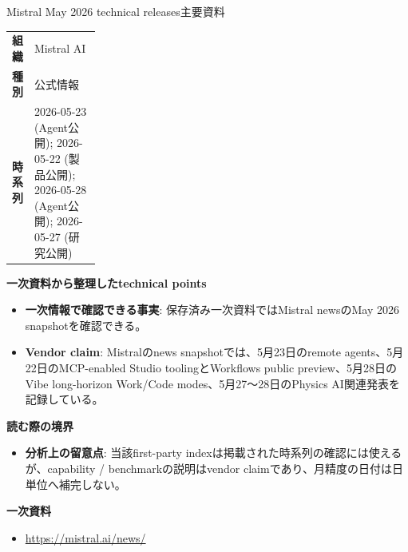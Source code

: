 \begin{technicalnote}{Mistral May 2026 technical releases}{主要資料}
\begingroup
\begin{tabularx}{\linewidth}{@{}>{\bfseries}p{0.22\linewidth}X@{}}
組織 & Mistral AI \\
種別 & 公式情報 \\
時系列 & 2026-05-23 (Agent公開); 2026-05-22 (製品公開); 2026-05-28 (Agent公開); 2026-05-27 (研究公開) \\
\end{tabularx}
\smallskip
{\bfseries 一次資料から整理したtechnical points}
\begin{itemize}[leftmargin=1.5em,itemsep=0.35em]
\item \textbf{一次情報で確認できる事実}: 保存済み一次資料ではMistral newsのMay 2026 snapshotを確認できる。
\end{itemize}
\begin{minipage}{\linewidth}
\begin{itemize}[leftmargin=1.5em,itemsep=0.35em]
\item \textbf{Vendor claim}: Mistralのnews snapshotでは、5月23日のremote agents、5月22日のMCP-enabled Studio toolingとWorkflows public preview、5月28日のVibe long-horizon Work/Code modes、5月27〜28日のPhysics AI関連発表を記録している。
\end{itemize}
{\bfseries 読む際の境界}
\begin{itemize}[leftmargin=1.5em,itemsep=0.35em]
\item \textbf{分析上の留意点}: 当該first-party indexは掲載された時系列の確認には使えるが、capability / benchmarkの説明はvendor claimであり、月精度の日付は日単位へ補完しない。
\end{itemize}
\begin{samepage}
{\bfseries 一次資料}
\begingroup\sloppy
\begin{itemize}[leftmargin=1.5em,itemsep=0.25em]
\item {\scriptsize\url{https://mistral.ai/news/}}
\end{itemize}
\endgroup
\end{samepage}
\end{minipage}
\endgroup
\end{technicalnote}
\medskip

